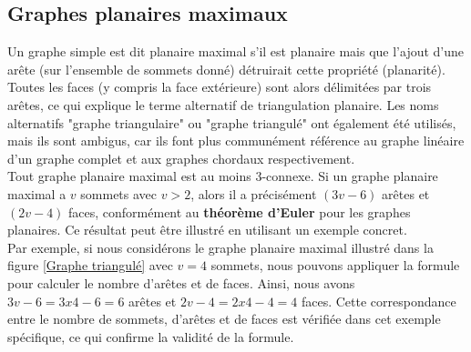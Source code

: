 \documentclass[hidelinks,letterpaper,12pt]{article}
\begin{document}
\bigbreak

\subsection{Graphes planaires maximaux}
\label{Graphes planaires maximaux}
Un graphe simple est dit planaire maximal s'il est planaire mais que l'ajout d'une arête (sur l'ensemble de sommets donné) détruirait cette propriété (planarité). Toutes les faces (y compris la face extérieure) sont alors délimitées par trois arêtes, ce qui explique le terme alternatif de triangulation planaire. Les noms alternatifs "graphe triangulaire" \citep{schnyder1989planar} ou "graphe triangulé"\citep{bhasker1988linear} ont également été utilisés, mais ils sont ambigus, car ils font plus communément référence au graphe linéaire d'un graphe complet et aux graphes chordaux respectivement. 
\\
Tout graphe planaire maximal est au moins 3-connexe. Si un graphe planaire maximal a $v$ sommets avec $v > 2$, alors il a précisément \((3v-6)\) arêtes et \((2v-4)\) faces, conformément au \textbf{théorème d'Euler} pour les graphes planaires. Ce résultat peut être illustré en utilisant un exemple concret.
\\
Par exemple, si nous considérons le graphe planaire maximal illustré dans la figure \ref{Graphe triangulé} avec \(v = 4\) sommets, nous pouvons appliquer la formule pour calculer le nombre d'arêtes et de faces. Ainsi, nous avons \(3v - 6 = 3 x 4 - 6 = 6\) arêtes et \(2v - 4 = 2 x 4 - 4 = 4\) faces. Cette correspondance entre le nombre de sommets, d'arêtes et de faces est vérifiée dans cet exemple spécifique, ce qui confirme la validité de la formule.

\bigbreak

\newpage
\end{document}

